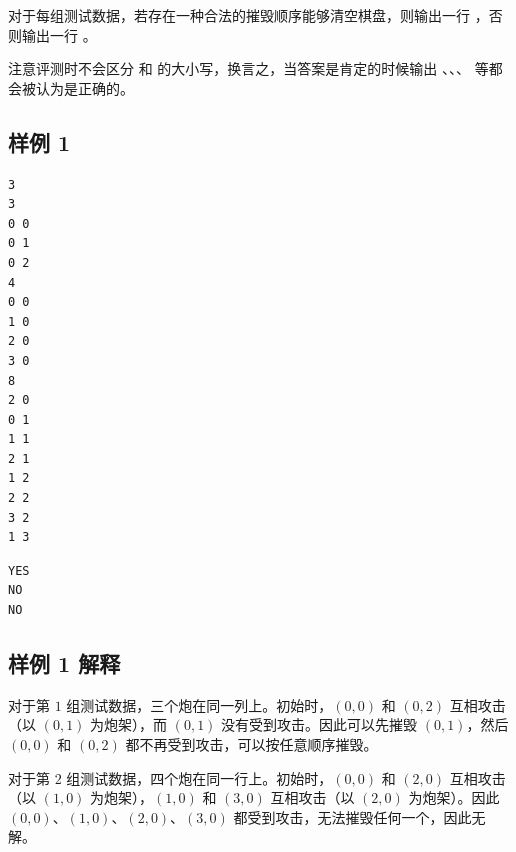 对于每组测试数据，若存在一种合法的摧毁顺序能够清空棋盘，则输出一行 ，否则输出一行 。

注意评测时不会区分  和  的大小写，换言之，当答案是肯定的时候输出 、、、 等都会被认为是正确的。

\subsection{样例 1}

\begin{minipage}{\linewidth}
	\begin{minipage}[t]{0.49\linewidth}
		\begin{lstlisting}[title=\texttt{standard input}]
3
3
0 0
0 1
0 2
4
0 0
1 0
2 0
3 0
8
2 0
0 1
1 1
2 1
1 2
2 2
3 2
1 3
\end{lstlisting}
	\end{minipage}
	\begin{minipage}[t]{0.49\linewidth}
		\begin{lstlisting}[title=\texttt{standard output}]
YES
NO
NO
\end{lstlisting}
	\end{minipage}
\end{minipage}


\subsection{样例 1 解释}

对于第 $1$ 组测试数据，三个炮在同一列上。初始时，$(0, 0)$ 和 $(0, 2)$ 互相攻击（以 $(0, 1)$ 为炮架），而 $(0, 1)$ 没有受到攻击。因此可以先摧毁 $(0, 1)$，然后 $(0, 0)$ 和 $(0, 2)$ 都不再受到攻击，可以按任意顺序摧毁。

对于第 $2$ 组测试数据，四个炮在同一行上。初始时，$(0, 0)$ 和 $(2, 0)$ 互相攻击（以 $(1, 0)$ 为炮架），$(1, 0)$ 和 $(3, 0)$ 互相攻击（以 $(2, 0)$ 为炮架）。因此 $(0, 0)$、$(1, 0)$、$(2, 0)$、$(3, 0)$ 都受到攻击，无法摧毁任何一个，因此无解。

